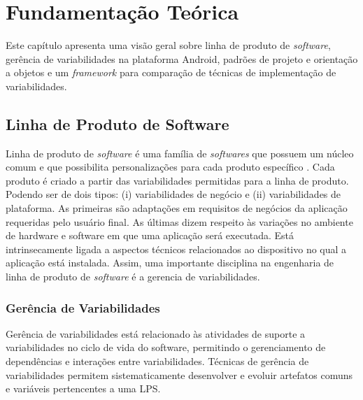 \chapter{Fundamentação Teórica}
Este capítulo apresenta uma visão geral sobre linha de produto de \textit{software},
gerência de variabilidades na plataforma Android, padrões de projeto e orientação
a objetos e um \textit{framework} para comparação de técnicas de implementação
de variabilidades.

\section{Linha de Produto de Software}

Linha de produto de \textit{software} é uma família de \textit{softwares} que possuem um núcleo
comum e que possibilita personalizações para cada produto específico \cite{Clements2001}.
Cada produto é criado a partir das variabilidades permitidas para a linha de produto.
Podendo ser de dois tipos: (i) variabilidades de negócio e (ii) variabilidades de
plataforma.
As primeiras são adaptações em requisitos de negócios da aplicação requeridas pelo
usuário final.
As últimas dizem respeito às variações no ambiente de hardware e software em que
uma aplicação será executada. Está intrinsecamente ligada a aspectos técnicos
relacionados ao dispositivo no qual a aplicação está instalada. Assim, uma
importante disciplina na engenharia de linha de produto de \textit{software} é a
gerencia de variabilidades.

\subsection{Gerência de Variabilidades}

Gerência de variabilidades está relacionado às atividades de suporte a variabilidades
no ciclo de vida do software, permitindo o gerenciamento de dependências e interações
entre variabilidades. Técnicas de gerência de variabilidades permitem sistematicamente
desenvolver e evoluir artefatos comuns e variáveis pertencentes a uma LPS.


